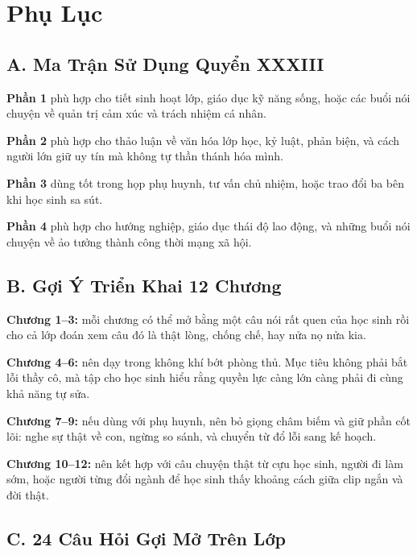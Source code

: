\chapter*{Phụ Lục}

\section*{A. Ma Trận Sử Dụng Quyển XXXIII}

\begin{tongketchuong}
\textbf{Phần 1} phù hợp cho tiết sinh hoạt lớp, giáo dục kỹ năng sống, hoặc các buổi nói chuyện về quản trị cảm xúc và trách nhiệm cá nhân.

\textbf{Phần 2} phù hợp cho thảo luận về văn hóa lớp học, kỷ luật, phản biện, và cách người lớn giữ uy tín mà không tự thần thánh hóa mình.

\textbf{Phần 3} dùng tốt trong họp phụ huynh, tư vấn chủ nhiệm, hoặc trao đổi ba bên khi học sinh sa sút.

\textbf{Phần 4} phù hợp cho hướng nghiệp, giáo dục thái độ lao động, và những buổi nói chuyện về ảo tưởng thành công thời mạng xã hội.
\end{tongketchuong}

\section*{B. Gợi Ý Triển Khai 12 Chương}

\begin{goigiaovien}
\textbf{Chương 1--3:} mỗi chương có thể mở bằng một câu nói rất quen của học sinh rồi cho cả lớp đoán xem câu đó là thật lòng, chống chế, hay nửa nọ nửa kia.

\textbf{Chương 4--6:} nên dạy trong không khí bớt phòng thủ. Mục tiêu không phải bắt lỗi thầy cô, mà tập cho học sinh hiểu rằng quyền lực càng lớn càng phải đi cùng khả năng tự sửa.

\textbf{Chương 7--9:} nếu dùng với phụ huynh, nên bỏ giọng châm biếm và giữ phần cốt lõi: nghe sự thật về con, ngừng so sánh, và chuyển từ đổ lỗi sang kế hoạch.

\textbf{Chương 10--12:} nên kết hợp với câu chuyện thật từ cựu học sinh, người đi làm sớm, hoặc người từng đổi ngành để học sinh thấy khoảng cách giữa clip ngắn và đời thật.
\end{goigiaovien}

\section*{C. 24 Câu Hỏi Gợi Mở Trên Lớp}

